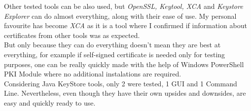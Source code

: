 \documentclass[10pt, a4paper]{report}
\begin{document}
Other tested tools can be also used, but \textit{OpenSSL, Keytool, XCA} and \textit{Keystore Explorer} can do almost everything, along with their ease of use. My personal favourite has become \textit{XCA} as it is a tool where I confirmed if information about certificates from other tools was as expected.\\

But only because they can do everything doesn't mean they are best at everything, for example if self-signed certificate is needed only for testing purposes, one can be really quickly made with the help of Windows PowerShell PKI Module where no additional instalations are required.\\

Considering Java KeyStore tools, only 2 were tested, 1 GUI and 1 Command Line. Nevertheless, even though they have their own upsides and downsides, are easy and quickly ready to use.\\
\end{document}
